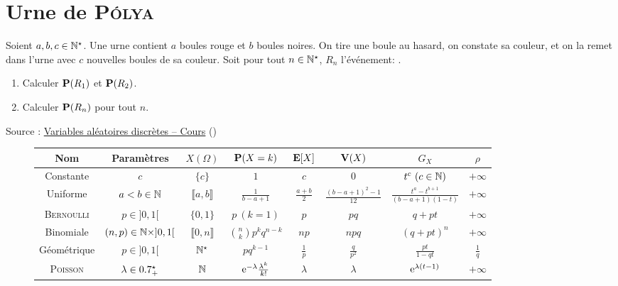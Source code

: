 \section{Urne de \textsc{Pólya}}
\begin{exercice}
    Soient $a, b, c \in \Ne$. Une urne contient $a$ boules rouge et $b$ boules noires. On tire une boule au hasard, on constate sa couleur, et on la remet dans l'urne avec $c$ nouvelles boules de sa couleur. Soit pour tout $n \in \Ne$, $R_n$ l'événement: .
    \begin{enumerate}
        \item Calculer $\P(R_1)$ et $\P(R_2)$.
        \item Calculer $\P(R_n)$ pour tout $n$.
    \end{enumerate}
\end{exercice}

\newpage

Source : \href{https://acamanes.github.io/psi/psi_doc/chap_e07.pdf}{Variables aléatoires discrètes -- Cours} (\cite{acamanes})
\begin{figure*}
    \begingroup
    \renewcommand{\arraystretch}{1.5} %
    \begin{tabular}{|c|c|c|c|c|c|c|c|}
        \hline
        Nom & Paramètres & $X(\Omega)$ & $\P(X=k)$ & $\E[X]$ & $\V(X)$ & $G_X$ & $\rho$\\
        \hline \hline
        Constante & $c$ & $\{c\}$ & $1$ & $c$ & $0$ & $t^c\ (c \in \N)$ & $+\infty$ \\
        \hline
        Uniforme & $a < b \in \N$ & $\llbracket a, b \rrbracket$ & $\frac{1}{b-a+1}$ & $\frac{a+b}{2}$ & $\frac{(b-a+1)^2 - 1}{12}$ & $\frac{t^a - t^{b+1}}{(b-a+1)(1-t)}$ & $+\infty$ \\
        \hline
        \textsc{Bernoulli} & $p \in ]0, 1[$ & $\{0, 1\}$ & $p\ (k=1)$ & $p$ & $pq$ & $q + pt$ & $+\infty$ \\
        \hline
        Binomiale & $(n, p) \in \N \times ]0, 1[$ & $\llbracket 0, n \rrbracket$ & $\binom{n}{k} p^k q^{n-k}$ & $np$ & $npq$ & $(q + pt)^n$ & $+\infty$ \\
        \hline
        Géométrique & $p \in ]0, 1[$ & $\Ne$ & $pq^{k-1}$ & $\frac{1}{p}$ & $\frac{q}{p^2}$ & $\frac{pt}{1-qt}$ & $\frac{1}{q}$ \\
        \hline
        \textsc{Poisson} & $\lambda \in \Rpe$ & $\N$ & $\e^{-\lambda} \frac{\lambda^k}{k!}$ & $\lambda$ & $\lambda$ & $\e^{\lambda(t-1)}$ & $+\infty$ \\
        \hline
    \end{tabular}
    \endgroup
\end{figure*}



